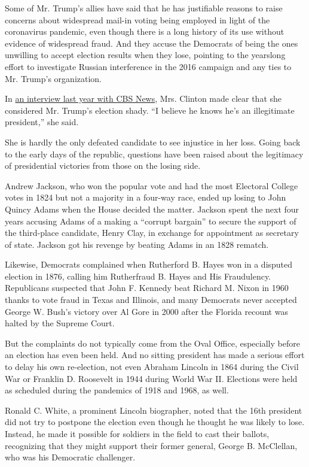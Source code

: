 Some of Mr. Trump's allies have said that he has justifiable reasons to
raise concerns about widespread mail-in voting being employed in light
of the coronavirus pandemic, even though there is a long history of its
use without evidence of widespread fraud. And they accuse the Democrats
of being the ones unwilling to accept election results when they lose,
pointing to the yearslong effort to investigate Russian interference in
the 2016 campaign and any ties to Mr. Trump's organization.

In
\href{https://www.cbsnews.com/video/hillary-clinton-trump-knows-hes-an-illegitimate-president/\#x}{an
interview last year with CBS News}, Mrs. Clinton made clear that she
considered Mr. Trump's election shady. ``I believe he knows he's an
illegitimate president,'' she said.

She is hardly the only defeated candidate to see injustice in her loss.
Going back to the early days of the republic, questions have been raised
about the legitimacy of presidential victories from those on the losing
side.

Andrew Jackson, who won the popular vote and had the most Electoral
College votes in 1824 but not a majority in a four-way race, ended up
losing to John Quincy Adams when the House decided the matter. Jackson
spent the next four years accusing Adams of a making a ``corrupt
bargain'' to secure the support of the third-place candidate, Henry
Clay, in exchange for appointment as secretary of state. Jackson got his
revenge by beating Adams in an 1828 rematch.

Likewise, Democrats complained when Rutherford B. Hayes won in a
disputed election in 1876, calling him Rutherfraud B. Hayes and His
Fraudulency. Republicans suspected that John F. Kennedy beat Richard M.
Nixon in 1960 thanks to vote fraud in Texas and Illinois, and many
Democrats never accepted George W. Bush's victory over Al Gore in 2000
after the Florida recount was halted by the Supreme Court.

But the complaints do not typically come from the Oval Office,
especially before an election has even been held. And no sitting
president has made a serious effort to delay his own re-election, not
even Abraham Lincoln in 1864 during the Civil War or Franklin D.
Roosevelt in 1944 during World War II. Elections were held as scheduled
during the pandemics of 1918 and 1968, as well.

Ronald C. White, a prominent Lincoln biographer, noted that the 16th
president did not try to postpone the election even though he thought he
was likely to lose. Instead, he made it possible for soldiers in the
field to cast their ballots, recognizing that they might support their
former general, George B. McClellan, who was his Democratic challenger.

